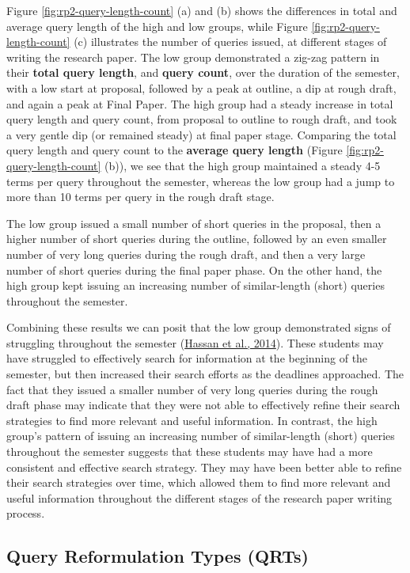 \documentclass[letterpaper, nobind]{templates/ociamthesis}
\begin{document}
Figure \ref{fig:rp2-query-length-count} (a) and (b) shows the differences in total and average query length of the high and low groups, while Figure \ref{fig:rp2-query-length-count} (c) illustrates the number of queries issued, at different stages of writing the research paper.
The low group demonstrated a zig-zag pattern in their \textbf{total query length}, and \textbf{query count}, over the duration of the semester, with a low start at proposal, followed by a peak at outline, a dip at rough draft, and again a peak at Final Paper.
The high group had a steady increase in total query length and query count, from proposal to outline to rough draft, and took a very gentle dip (or remained steady) at final paper stage.
Comparing the total query length and query count to the \textbf{average query length} (Figure \ref{fig:rp2-query-length-count} (b)), we see that the high group maintained a steady 4-5 terms per query throughout the semester, whereas the low group had a jump to more than 10 terms per query in the rough draft stage.

The low group issued a small number of short queries in the proposal, then a higher number of short queries during the outline, followed by an even smaller number of very long queries during the rough draft, and then a very large number of short queries during the final paper phase.
On the other hand, the high group kept issuing an increasing number of similar-length (short) queries throughout the semester.

Combining these results we can posit that the low group demonstrated signs of struggling throughout the semester (\protect\hyperlink{ref-hassan2014struggling}{Hassan et al., 2014}).
These students may have struggled to effectively search for information at the beginning of the semester, but then increased their search efforts as the deadlines approached. The fact that they issued a smaller number of very long queries during the rough draft phase may indicate that they were not able to effectively refine their search strategies to find more relevant and useful information.
In contrast, the high group's pattern of issuing an increasing number of similar-length (short) queries throughout the semester suggests that these students may have had a more consistent and effective search strategy. They may have been better able to refine their search strategies over time, which allowed them to find more relevant and useful information throughout the different stages of the research paper writing process.

\hypertarget{query-reformulation-types-qrts}{%
\subsection{Query Reformulation Types (QRTs)}\label{query-reformulation-types-qrts}}
\end{document}
